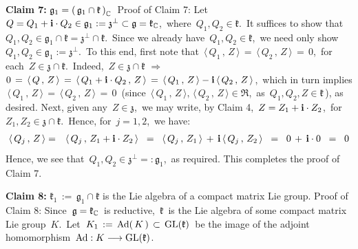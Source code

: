 \vskip 0.3cm
\noindent
\textbf{Claim 7:}\;\;
$\mathfrak{g}_{1} = \left(\,\mathfrak{g}_{1}\cap\mathfrak{k}\,\right)_{\mathbb{C}}$\,
\vskip 0.05cm
\noindent
Proof of Claim 7:\;\;
Let \,$Q = Q_{1} + \mathbf{i}\cdot Q_{2} \in \mathfrak{g}_{1} := \mathfrak{z}^{\perp} \subset \mathfrak{g} = \mathfrak{k}_{\mathbb{C}}$,\,
where \,$Q_{1}, Q_{2} \in \mathfrak{k}$.\,
It suffices to show that \,$Q_{1}, Q_{2} \in \mathfrak{g}_{1} \cap \mathfrak{k} = \mathfrak{z}^{\perp} \cap \mathfrak{k}$.\,
Since we already have \,$Q_{1}, Q_{2} \in \mathfrak{k}$,\,
we need only show \,$Q_{1}, Q_{2} \in \mathfrak{g}_{1} := \mathfrak{z}^{\perp}$.\,
To this end, first note that
\,$\langle\,Q_{1}\,,\,Z\,\rangle \,=\, \langle\,Q_{2}\,,\,Z\,\rangle \,=\, 0$,\,
for each \,$Z \in \mathfrak{z} \cap \mathfrak{k}$.\,
Indeed,
\,$Z \in \mathfrak{z}\cap\mathfrak{k}$
\;$\Longrightarrow$\;
$0 \,=\, \langle\,Q\,,\,Z\,\rangle \,=\, \langle\,Q_{1} + \mathbf{i}\cdot Q_{2}\,,\,Z\,\rangle \,=\, \langle\,Q_{1}\,,\,Z\,\rangle - \mathbf{i}\,\langle\,Q_{2}\,,\,Z\,\rangle$,\,
which in turn implies
\,$\langle\,Q_{1}\,,\,Z\,\rangle \,=\, \langle\,Q_{2}\,,\,Z\,\rangle \,=\, 0$\,
(since \,$\langle\,Q_{1}\,,\,Z\,\rangle,\, \langle\,Q_{2}\,,\,Z\,\rangle \in \Re$,\,
as \,$Q_{1}, Q_{2}, Z \in \mathfrak{k}$\,), as desired.
Next, given any \,$Z \in \mathfrak{z}$,\, we may write, by Claim 4,
\,$Z = Z_{1} + \mathbf{i}\cdot Z_{2}$,\, for \,$Z_{1}, Z_{2} \in \mathfrak{z} \cap \mathfrak{k}$.\,
Hence, for \,$j = 1, 2$,\, we have:
\begin{eqnarray*}
\langle\,Q_{j}\,,\,Z\,\rangle
& = &
    \langle\,Q_{j}\,,\,Z_{1} + \mathbf{i}\cdot Z_{2}\,\rangle
\;\; = \;\;
    \langle\,Q_{j}\,,\,Z_{1}\,\rangle
    \,+\,
    \mathbf{i}\,\langle\,Q_{j}\,,\,Z_{2}\,\rangle
\;\; = \;\;
    0 \,+\, \mathbf{i}\cdot 0
\;\; = \;\;
    0
\end{eqnarray*}
Hence, we see that
\,$Q_{1}, Q_{2} \in \mathfrak{z}^{\perp} =: \mathfrak{g}_{1}$,\, as required.
This completes the proof of Claim 7.

\vskip 0.3cm
\noindent
\textbf{Claim 8:}\;\;
$\mathfrak{k}_{1} \,:=\, \mathfrak{g}_{1}\cap\mathfrak{k}$\;
is the Lie algebra of a compact matrix Lie group.
\vskip 0.05cm
\noindent
Proof of Claim 8:\;\;
Since \,$\mathfrak{g} = \mathfrak{k}_{\mathbb{C}}$\, is reductive,
\,$\mathfrak{k}$\, is the Lie algebra of some compact matrix Lie group \,$K$.\, 
Let
\,$K_{1} \,:=\, \textnormal{Ad}\!\left(\,K\,\right) \,\subset\, \textnormal{GL}(\mathfrak{k})$\,
be the image of the adjoint homomorphism
\,$\textnormal{Ad} : K \longrightarrow \textnormal{GL}(\mathfrak{k})$.\,

